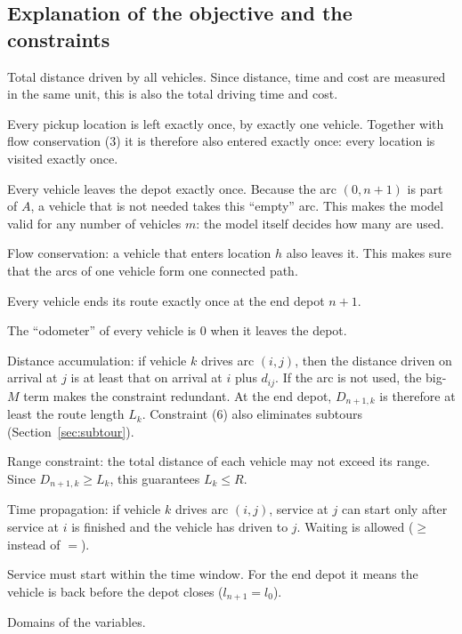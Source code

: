 \documentclass[11pt,a4paper]{article}
\theoremstyle{definition}
\begin{document}
\subsection{Explanation of the objective and the constraints}
\begin{description}[leftmargin=1.1cm,style=sameline,font=\normalfont\bfseries]
\item[(0)] Total distance driven by all vehicles. Since distance, time and cost are measured in the same unit, this is also the total driving time and cost.
\item[(1)] Every pickup location is left exactly once, by exactly one vehicle. Together with flow conservation (3) it is therefore also entered exactly once: every location is visited exactly once.
\item[(2)] Every vehicle leaves the depot exactly once. Because the arc $(0,n+1)$ is part of $A$, a vehicle that is not needed takes this ``empty'' arc. This makes the model valid for any number of vehicles $m$: the model itself decides how many are used.
\item[(3)] Flow conservation: a vehicle that enters location $h$ also leaves it. This makes sure that the arcs of one vehicle form one connected path.
\item[(4)] Every vehicle ends its route exactly once at the end depot $n+1$.
\item[(5)] The ``odometer'' of every vehicle is $0$ when it leaves the depot.
\item[(6)] Distance accumulation: if vehicle $k$ drives arc $(i,j)$, then the distance driven on arrival at $j$ is at least that on arrival at $i$ plus $d_{ij}$. If the arc is not used, the big-$M$ term makes the constraint redundant. At the end depot, $D_{n+1,k}$ is therefore at least the route length $L_k$. Constraint (6) also eliminates subtours (Section~\ref{sec:subtour}).
\item[(7)] Range constraint: the total distance of each vehicle may not exceed its range. Since $D_{n+1,k}\ge L_k$, this guarantees $L_k\le R$.
\item[(8)] Time propagation: if vehicle $k$ drives arc $(i,j)$, service at $j$ can start only after service at $i$ is finished and the vehicle has driven to $j$. Waiting is allowed ($\ge$ instead of $=$).
\item[(9)] Service must start within the time window. For the end depot it means the vehicle is back before the depot closes ($l_{n+1}=l_0$).
\item[(10)] Domains of the variables.
\end{description}
\end{document}

